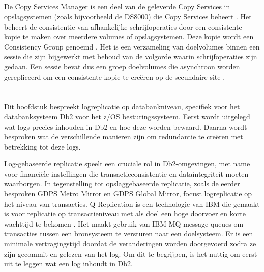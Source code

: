 \subsection{}
\label{sec:mainframe-replicatie-consistency-groups}

De Copy Services Manager is een deel van de geleverde Copy Services in opslagsystemen (zoals bijvoorbeeld de DS8000) die Copy Services beheert \autocite{ibm_2023_ibm_copy_services_manager}.
Het beheert de consistentie van afhankelijke schrijfoperaties door een consistente kopie te maken over meerdere volumes of opslagsystemen.
Deze kopie wordt een Consistency Group genoemd \autocite{ibm_2026_ibm_sessions_consistency_groups}.
Het is een verzameling van doelvolumes binnen een sessie die zijn bijgewerkt met behoud van de volgorde waarin schrijfoperaties zijn gedaan.
Een sessie bevat dus een groep doelvolumes die asynchroon worden gerepliceerd om een consistente kopie te creëren op de secundaire site \autocite{ibm_2026_copy_services_features}.

\section{}%
\label{sec:log-replicatie}

Dit hoofdstuk bespreekt logreplicatie op databankniveau, specifiek voor het databanksysteem Db2 voor het z/OS besturingssysteem.
Eerst wordt uitgelegd wat logs precies inhouden in Db2 en hoe deze worden bewaard.
Daarna wordt besproken wat de verschillende manieren zijn om redundantie te creëren met betrekking tot deze logs.

Log-gebaseerde replicatie speelt een cruciale rol in Db2-omgevingen, met name voor financiële instellingen die transactieconsistentie en dataintegriteit moeten waarborgen.
In tegenstelling tot opslaggebaseerde replicatie, zoals de eerder besproken GDPS Metro Mirror en GDPS Global Mirror, focust logreplicatie op het niveau van transacties.
Q Replication is een technologie van IBM die gemaakt is voor replicatie op transactieniveau met als doel een hoge doorvoer en korte wachttijd te bekomen \autocite{ibm_2026_infosphere}.
Het maakt gebruik van IBM MQ message queues om transacties tussen een bronsysteem te versturen naar een doelsysteem.
Er is een minimale vertragingstijd doordat de veranderingen worden doorgevoerd zodra ze zijn gecommit en gelezen van het log.
Om dit te begrijpen, is het nuttig om eerst uit te leggen wat een log inhoudt in Db2.

